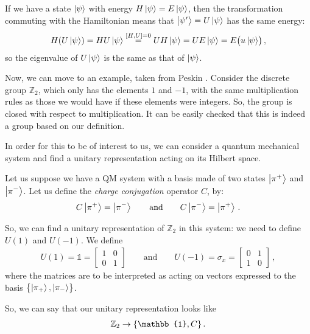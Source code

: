 \documentclass[main.tex]{subfiles}
\begin{document}
If we have a state \(\ket{\psi }\) with energy \(H \ket{\psi } = E \ket{\psi }\), then the transformation commuting with the Hamiltonian means that \(\ket{\psi'} = U \ket{\psi }\) has the same energy: 
%
\begin{align}
H (U \ket{\psi }) = HU \ket{\psi } \overset{[H, U] = 0}{=} UH \ket{\psi } =
 U E \ket{\psi } = E \qty(u \ket{\psi })
\,,
\end{align}
%
so the eigenvalue of \(U \ket{\psi }\) is the same as that of \(\ket{\psi }\).

Now, we can move to an example, taken from Peskin \cite[eq.\ 2.38 onward]{peskinConceptsElementaryParticle2019}. 
Consider the discrete group \(\mathbb{Z}_{2}\), which only has the elements \(1\) and \(-1\), with the same multiplication rules as those we would have if these elements were integers. 
So, the group is closed with respect to multiplication.
It can be easily checked that this is indeed a group based on our definition. 

In order for this to be of interest to us, we can consider a quantum mechanical system and find a unitary representation acting on its Hilbert space. 

Let us suppose we have a QM system with a basis made of two states \(\ket{\pi^{+}}\) and \(\ket{\pi^{-}}\). Let us define the \emph{charge conjugation} operator \(C\), by: 
%
\begin{align}
C \ket{\pi^{+}} = \ket{\pi^{-}} 
\qquad \text{and} \qquad
C \ket{\pi^{-}} = \ket{\pi^{+}} 
\,.
\end{align}

So, we can find a unitary representation of \(\mathbb{Z}_{2}\) in this system: we need to define \(U(1)\) and \(U(-1)\). We define 
%
\begin{subequations}
\begin{align}
U(1) = \mathbb{1} =\left[\begin{array}{cc}
1 & 0 \\ 
0 & 1
\end{array}\right] 
\qquad \text{and} \qquad
U(-1) = \sigma_{x} = \left[\begin{array}{cc}
0 & 1 \\ 
1 & 0
\end{array}\right]
\,,
\end{align}
\end{subequations}
%
where the matrices are to be interpreted as acting on vectors expressed to the basis \(\qty{\ket{\pi_{+}}, \ket{\pi_{-}}}\).

So, we can say that our unitary representation looks like 
%
\begin{align}
\mathbb{Z}_{2} \rightarrow \qty{\mathbb{1}, C}
\,.
\end{align}
\end{document}
